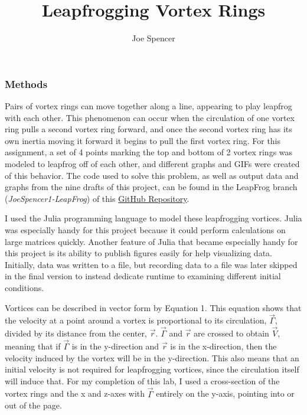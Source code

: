 \documentclass{article}
\begin{document}
\author{Joe Spencer}
\title{Leapfrogging Vortex Rings}
\date{}  %
\maketitle

\subsubsection*{Methods}
Pairs of vortex rings can move together along a line, appearing to play leapfrog with each other. This phenomenon can occur when the circulation of one vortex ring pulls a second vortex ring forward, and once the second vortex ring has its own inertia moving it forward it begins to pull the first vortex ring. For this assignment, a set of 4 points marking the top and bottom of 2 vortex rings was modeled to leapfrog off of each other, and different graphs and GIFs were created of this behavior. The code used to solve this problem, as well as output data and graphs from the nine drafts of this project, can be found in the LeapFrog branch (\emph{JoeSpencer1-LeapFrog}) of this \href{https://github.com/JoeSpencer1/497R-Projects.git}{GitHub Repository}. \newline

I used the Julia programming language to model these leapfrogging vortices. Julia was especially handy for this project because it could perform calculations on large matrices quickly. Another feature of Julia that became especially handy for this project is its ability to publish figures easily for help visualizing data. Initially, data was written to a file, but recording data to a file was later skipped in the final version to instead dedicate runtime to examining different initial conditions.\newline

Vortices can be described in vector form by Equation 1. This equation shows that the velocity at a point around a vortex is proportional to its circulation, $\vec{\Gamma}$, divided by its distance from the center, $\vec{r}$. $\vec{\Gamma}$ and $\vec{r}$ are crossed to obtain $\vec{V}$, meaning that if $\vec{\Gamma}$ is in the y-direction and $\vec{r}$ is in the x-direction, then the velocity induced by the vortex will be in the y-direction. This also means that an initial velocity is not required for leapfrogging vortices, since the circulation itself will induce that. For my completion of this lab, I used a cross-section of the vortex rings and the x and z-axes with $\vec{\Gamma}$ entirely on the y-axis, pointing into or out of the page.  \newline
\end{document}
